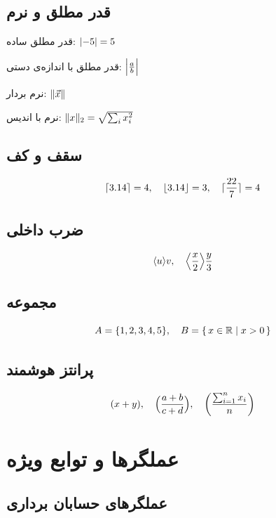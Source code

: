 \documentclass{matinbook}
\begin{document}
\section{قدر مطلق و نرم}
\label{sec:delimiters-abs-norm}

قدر مطلق ساده: $\abs{-5} = 5$

قدر مطلق با اندازه‌ی دستی: $\abs[\Big]{\frac{a}{b}}$

نرم بردار: $\norm{\vec{x}}$

نرم با اندیس: $\norm{x}_{2} = \sqrt{\sum_{i} x_{i}^{2}}$

\section{سقف و کف}
\label{sec:delimiters-ceil-floor}

\[
\ceil{3.14} = 4, \quad
\floor{3.14} = 3, \quad
\ceil[Big]{\frac{22}{7}} = 4
\]

\section{ضرب داخلی}
\label{sec:delimiters-inner}

\[
\inner{u}{v}, \quad
\inner[\Big]{\frac{x}{2}}{\frac{y}{3}}
\]

\section{مجموعه}
\label{sec:delimiters-set}

\[
A = \set{1, 2, 3, 4, 5}, \quad
B = \setbuilder{x \in \R}{x > 0}
\]

\section{پرانتز هوشمند}
\label{sec:delimiters-paren}

\[
\paren{x + y}, \quad
\paren[\Big]{\frac{a + b}{c + d}}, \quad
\paren*{\frac{\sum_{i=1}^{n} x_{i}}{n}}
\]

\chapter{عملگرها و توابع ویژه}
\label{chap:operators}

\section{عملگرهای حسابان برداری}
\label{sec:operators-vector}
\end{document}
